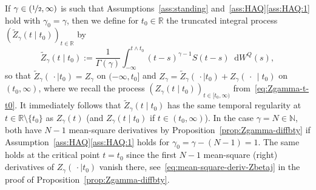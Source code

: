 \documentclass[reqno]{amsart}
\numberwithin{equation}{section}
\newcommand{\bbR}{\mathbb{R}}
\newcommand{\R}{\mathbb{R}}
\newcommand{\N}{\mathbb{N}}
\newcommand{\rd}{\mathop{}\!\mathrm{d}}
\theoremstyle{remark}
\theoremstyle{definition}
\begin{document}
If $\gamma \in (\nicefrac{1}{2}, \infty)$ is such that 
Assumptions~\ref{ass:standing} and~\ref{ass:HAQ}\ref{ass:HAQ:1} hold with $\gamma_0 = \gamma$,
then we define for $t_0 \in \R$ the 
truncated integral process $(\widetilde Z_\gamma(t \mid t_0))_{t\in\R}$ by 
%
\begin{equation}\label{eq:def-truncated-process}
	\widetilde Z_\gamma(t \mid t_0) 
	:= 
	\frac{1}{\Gamma(\gamma)}
	\int_{-\infty}^{t \wedge t_0} (t-s)^{\gamma-1} S(t-s) \rd W^Q(s),
\end{equation}
%
so that $\widetilde Z_\gamma(\,\cdot \mid t_0) = Z_\gamma$ on $(-\infty, t_0]$
and
$Z_\gamma = \widetilde Z_\gamma(\,\cdot \mid t_0)
+
Z_\gamma(\,\cdot\, \mid t_0)$ on $(t_0, \infty)$,
where we recall the process $(Z_{\gamma}(t \mid t_0))_{t\in[t_0,\infty)}$ from~\eqref{eq:Zgamma-t-t0}.
It immediately follows that $\widetilde Z_\gamma(t \mid t_0)$ has the same temporal regularity
at $t \in \bbR\setminus\{t_0\}$
as $Z_\gamma(t)$ (and ${Z_\gamma(t \mid t_0)}$ if $t \in (t_0, \infty)$).
In the case $\gamma = N \in \N$,
both have $N - 1$ mean-square derivatives 
by Proposition~\ref{prop:Zgamma-diffbty} if Assumption~\ref{ass:HAQ}\ref{ass:HAQ:1}
holds for $\gamma_0 = \gamma - (N - 1) = 1$.
The same holds at the critical point $t = t_0$ since
the first $N - 1$ mean-square (right) derivatives of $Z_\gamma(\,\cdot \mid t_0)$ vanish there, 
see~\eqref{eq:mean-square-deriv-Zbetaj} in the proof of Proposition~\ref{prop:Zgamma-diffbty}.
\end{document}
